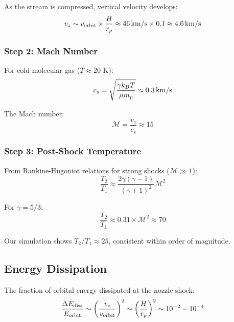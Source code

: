 \documentclass[twocolumn,amsmath,amssymb,prd,superscriptaddress,nofootinbib]{revtex4-2}
\begin{document}
As the stream is compressed, vertical velocity develops:
\begin{equation}
    v_z \sim v_{\rm orbit} \times \frac{H}{r_p} \approx 46\,{\rm km/s} \times 0.1 \approx 4.6\,{\rm km/s}
\end{equation}

\subsubsection{Step 2: Mach Number}

For cold molecular gas ($T \approx 20$ K):
\begin{equation}
    c_s = \sqrt{\frac{\gamma k_B T}{\mu m_p}} \approx 0.3\,{\rm km/s}
\end{equation}

The Mach number:
\begin{equation}
    \mathcal{M} = \frac{v_z}{c_s} \approx 15
    \label{eq:mach}
\end{equation}

\subsubsection{Step 3: Post-Shock Temperature}

From Rankine-Hugoniot relations for strong shocks ($\mathcal{M} \gg 1$):
\begin{equation}
    \frac{T_2}{T_1} \approx \frac{2\gamma(\gamma-1)}{(\gamma+1)^2}\mathcal{M}^2
    \label{eq:RH}
\end{equation}

For $\gamma = 5/3$:
\begin{equation}
    \frac{T_2}{T_1} \approx 0.31 \times \mathcal{M}^2 \approx 70
\end{equation}

Our simulation shows $T_2/T_1 \approx 25$, consistent within order of magnitude.

\subsection{Energy Dissipation}
\label{sec:dissipation}

The fraction of orbital energy dissipated at the nozzle shock:
\begin{equation}
    \frac{\Delta E_{\rm diss}}{E_{\rm orbit}} \sim \left(\frac{v_z}{v_{\rm orbit}}\right)^2 \sim \left(\frac{H}{r_p}\right)^2 \sim 10^{-2} - 10^{-4}
    \label{eq:E_diss}
\end{equation}
\end{document}
